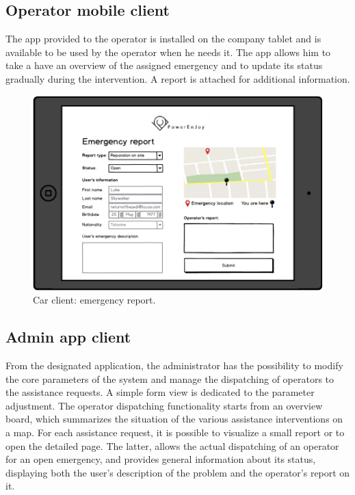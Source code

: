 \subsection{Operator mobile client}
	The app provided to the operator is installed on the company tablet and is available to be used by the operator when he needs it. The app allows him to take a have an overview of the assigned emergency and to update its status gradually during the intervention. A report is attached for additional information.

	\begin{figure}[h]
		\includegraphics[height=0.4\textheight, center]{img/user_interface_design/Operator_main.png}
		\caption{Car client: emergency report.}
	\end{figure}
\FloatBarrier

\subsection{Admin app client}
	From the designated application, the administrator has the possibility to modify the core parameters of the system and manage the dispatching of operators to the assistance requests.\newline
	A simple form view is dedicated to the parameter adjustment.\newline
	The operator dispatching functionality starts from an overview board, which summarizes the situation of the various assistance interventions on a map. For each assistance request, it is possible to visualize a small report or to open the detailed page. The latter, allows the actual dispatching of an operator for an open emergency, and provides general information about its status, displaying both the user's description of the problem and the operator's report on it.

